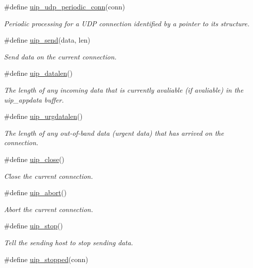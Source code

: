 \begin{CompactItemize}
\#define \hyperlink{a00063_gf5c2ad5acf3cc23b8262e9ba6a15136b}{uip\_\-udp\_\-periodic\_\-conn}(conn)
\begin{CompactList}\small\item\em Periodic processing for a UDP connection identified by a pointer to its structure. \item\end{CompactList}\item 
\#define \hyperlink{a00064_gb59415b2801e568f52bc1d86ef10e159}{uip\_\-send}(data, len)
\begin{CompactList}\small\item\em Send data on the current connection. \item\end{CompactList}\item 
\#define \hyperlink{a00064_g1a1bc437c09ddef238abab41d77c3177}{uip\_\-datalen}()
\begin{CompactList}\small\item\em The length of any incoming data that is currently avaliable (if avaliable) in the uip\_\-appdata buffer. \item\end{CompactList}\item 
\#define \hyperlink{a00064_g8411c95a4d89367ad2d9d6bde1a3d537}{uip\_\-urgdatalen}()
\begin{CompactList}\small\item\em The length of any out-of-band data (urgent data) that has arrived on the connection. \item\end{CompactList}\item 
\#define \hyperlink{a00064_g61db1dcb7c760e4dd5d60bf4e5576dca}{uip\_\-close}()
\begin{CompactList}\small\item\em Close the current connection. \item\end{CompactList}\item 
\#define \hyperlink{a00064_g88d2ccf7cd821f89d9a8df7e3948b56c}{uip\_\-abort}()
\begin{CompactList}\small\item\em Abort the current connection. \item\end{CompactList}\item 
\#define \hyperlink{a00064_g0a8bb9d6d0f1f56852ccfccbbad6c5d8}{uip\_\-stop}()
\begin{CompactList}\small\item\em Tell the sending host to stop sending data. \item\end{CompactList}\item 
\hypertarget{a00064_g64a238a5c02640a7a4aef004163aeb47}{
\#define \hyperlink{a00064_g64a238a5c02640a7a4aef004163aeb47}{uip\_\-stopped}(conn)}
\label{a00064_g64a238a5c02640a7a4aef004163aeb47}


\end{CompactItemize}
